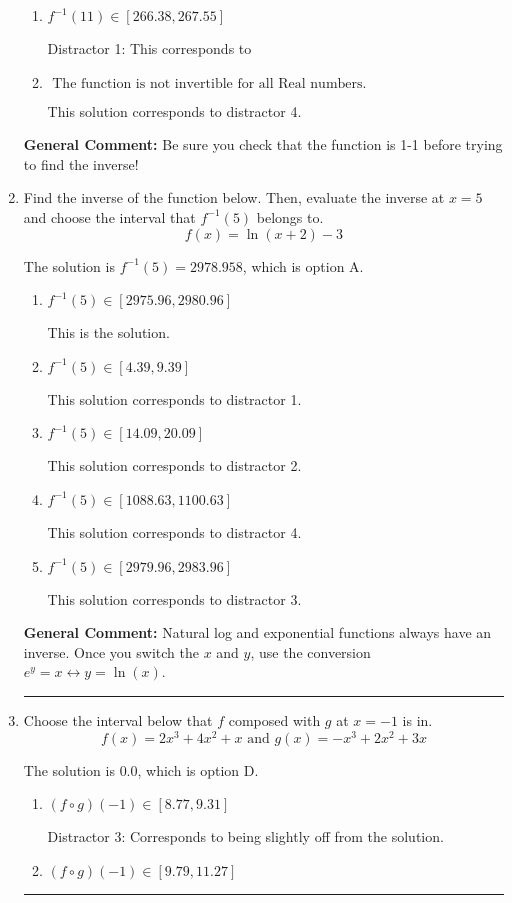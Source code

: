 \documentclass{extbook}[14pt]
\newcommand{\litem}[1]{\item #1

\rule{\textwidth}{0.4pt}}
\begin{document}
\begin{enumerate}
{\begin{enumerate}[label=\Alph*.]
 This solution corresponds to distractor 3.
\item \( f^{-1}(11) \in [266.38, 267.55] \)

 Distractor 1: This corresponds to 
\item \( \text{ The function is not invertible for all Real numbers. } \)

 This solution corresponds to distractor 4.
\end{enumerate}

\textbf{General Comment:} Be sure you check that the function is 1-1 before trying to find the inverse!
}
\litem{
Find the inverse of the function below. Then, evaluate the inverse at $x = 5$ and choose the interval that $f^{-1}(5)$ belongs to.
\[ f(x) = \ln{(x+2)}-3 \]

The solution is \( f^{-1}(5) = 2978.958 \), which is option A.\begin{enumerate}[label=\Alph*.]
\item \( f^{-1}(5) \in [2975.96, 2980.96] \)

 This is the solution.
\item \( f^{-1}(5) \in [4.39, 9.39] \)

 This solution corresponds to distractor 1.
\item \( f^{-1}(5) \in [14.09, 20.09] \)

 This solution corresponds to distractor 2.
\item \( f^{-1}(5) \in [1088.63, 1100.63] \)

 This solution corresponds to distractor 4.
\item \( f^{-1}(5) \in [2979.96, 2983.96] \)

 This solution corresponds to distractor 3.
\end{enumerate}

\textbf{General Comment:} Natural log and exponential functions always have an inverse. Once you switch the $x$ and $y$, use the conversion $ e^y = x \leftrightarrow y=\ln(x)$.
}
\litem{
Choose the interval below that $f$ composed with $g$ at $x=-1$ is in.
\[ f(x) = 2x^{3} +4 x^{2} +x \text{ and } g(x) = -x^{3} +2 x^{2} +3 x \]

The solution is \( 0.0 \), which is option D.\begin{enumerate}[label=\Alph*.]
\item \( (f \circ g)(-1) \in [8.77, 9.31] \)

 Distractor 3: Corresponds to being slightly off from the solution.
\item \( (f \circ g)(-1) \in [9.79, 11.27] \)


\end{enumerate}}
\end{enumerate}
\end{document}

